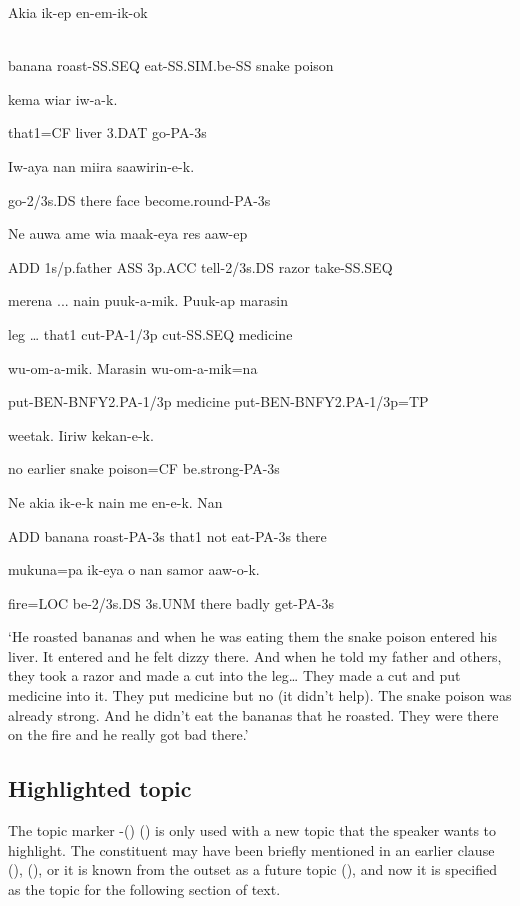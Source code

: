 \ea%
\label{ex:x1677}
\gll Akia  ik-ep  en-em-ik-ok   \\
      \\
\glt
\z

banana  roast-SS.SEQ  eat-SS.SIM.be-SS  snake  poison  

  kema  wiar  iw-a-k.

that1=CF  liver  3.DAT  go-PA-3s

Iw-aya  nan  miira  saawirin-e-k.

go-2/3s.DS  there  face  become.round-PA-3s

Ne  auwa  ame  wia  maak-eya  res  aaw-ep

ADD  1s/p.father  ASS  3p.ACC  tell-2/3s.DS  razor  take-SS.SEQ

merena  ...  nain  puuk-a-mik.  Puuk-ap  marasin

leg  {\dots}  that1  cut-PA-1/3p  cut-SS.SEQ  medicine

wu-om-a-mik.  Marasin  wu-om-a-mik=na

put-BEN-BNFY2.PA-1/3p  medicine  put-BEN-BNFY2.PA-1/3p=TP  

weetak.  Iiriw    kekan-e-k.

no  earlier  snake  poison=CF  be.strong-PA-3s  

Ne  akia  ik-e-k  nain  me  en-e-k.  Nan

ADD  banana  roast-PA-3s  that1  not  eat-PA-3s  there  

mukuna=pa  ik-eya \textstyleEmphasizedVernacularWords{} o  nan  samor  aaw-o-k.

fire=LOC  be-2/3s.DS  3s.UNM  there  badly  get-PA-3s

`He roasted bananas and when he was eating them the snake poison entered his liver. It entered and he felt dizzy there. And when he told my father and others, they took a razor and made a cut into the leg{\dots} They made a cut and put medicine into it. They put medicine but no (it didn't help). The snake poison was already strong. And he didn't eat the bananas that he roasted. They were there on the fire and he really got bad there.'

\subsection{Highlighted topic}
\hypertarget{RefHeading23881935131865}{}
The topic marker -() () is only used with a new topic that the speaker wants to highlight. The constituent may have been briefly mentioned in an earlier clause (), (), or it is known from the outset as a future topic (), and now it is specified as the topic for the following section of text. 

